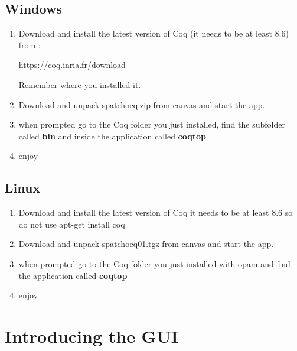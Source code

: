 \subsection{Windows}
\begin{enumerate}
\item Download and install  the latest version of Coq (it needs to be at least 8.6) from :

\href{https://coq.inria.fr/download}{https://coq.inria.fr/download}

Remember where you installed it.
\item  Download and unpack spatchocq.zip from canvas and  start the app.

\item when prompted go to the Coq folder you just installed, find the subfolder called {\bf bin} and inside the application called {\bf coqtop}

\item enjoy
\end{enumerate}


\subsection{Linux}
\begin{enumerate}
\item Download and install  the latest version of Coq it needs to be at least 8.6 so do not use 
apt-get install coq
\item  Download and unpack spatchocq01.tgz  from canvas and start the app.

\item when prompted go to the Coq folder you just installed with opam and find  the application called {\bf coqtop}

\item enjoy
\end{enumerate}

\section{Introducing the GUI}
